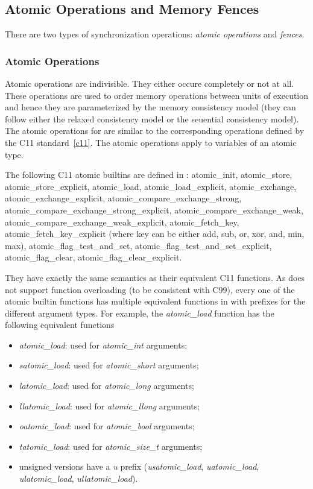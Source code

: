 \subsection{Atomic Operations and Memory Fences}

There are two types of synchronization operations: \emph{atomic operations} and
\emph{fences}.

\subsubsection{Atomic Operations}
Atomic operations are indivisible. They either occure completely or not at all.
These operations are used to order memory operations between units of execution
and hence they are parameterized by the \pencil memory consistency model
(they can follow either the relaxed consistency model or the seuential
consistency model).
The atomic operations for \pencil are similar to the corresponding operations
defined by the C11 standard~\ref{c11}.
The \pencil atomic operations apply to variables of an atomic type.

The following C11 atomic builtins are defined in \pencil:
atomic_init, atomic_store, atomic_store_explicit, atomic_load,
atomic_load_explicit, atomic_exchange, 	atomic_exchange_explicit,
atomic_compare_exchange_strong, atomic_compare_exchange_strong_explicit,
atomic_compare_exchange_weak, atomic_compare_exchange_weak_explicit,
atomic_fetch_key, atomic_fetch_key_explicit (where key can be either
add, sub, or, xor, and, min, max),
atomic_flag_test_and_set, atomic_flag_test_and_set_explicit,
atomic_flag_clear, atomic_flag_clear_explicit.

They have exactly the same semantics as their equivalent C11 functions.
As \pencil does not support function overloading (to be consistent
with C99), every one of the atomic builtin functions has multiple equivalent
functions in \pencil with prefixes for the different argument types.
For example, the \emph{atomic_load} function has the following equivalent
\pencil functions
\begin{itemize}
 \item \emph{atomic_load}: used for \emph{atomic_int} arguments;
 \item \emph{satomic_load}: used for \emph{atomic_short} arguments;
 \item \emph{latomic_load}: used for \emph{atomic_long} arguments;
 \item \emph{llatomic_load}: used for \emph{atomic_llong} arguments;
 \item \emph{oatomic_load}: used for \emph{atomic_bool} arguments;
 \item \emph{tatomic_load}: used for \emph{atomic_size_t} arguments;
 \item unsigned versions have a \emph{u} prefix
 (\emph{usatomic_load}, \emph{uatomic_load}, \emph{ulatomic_load},
 \emph{ullatomic_load}).
\end{itemize}

